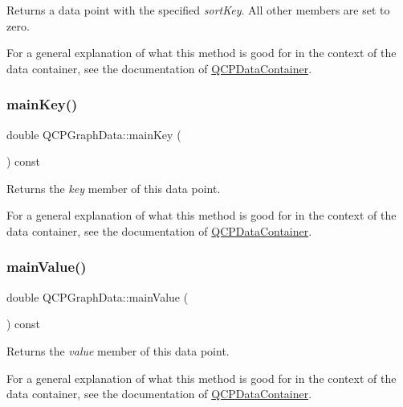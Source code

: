 Returns a data point with the specified {\itshape sort\+Key}. All other members are set to zero.

For a general explanation of what this method is good for in the context of the data container, see the documentation of \mbox{\hyperlink{class_q_c_p_data_container}{Q\+C\+P\+Data\+Container}}. \mbox{\label{class_q_c_p_graph_data_a72fdaf738f679ef93bea3d552ba42d1b}} 
\subsubsection{\texorpdfstring{mainKey()}{mainKey()}}
{\footnotesize\ttfamily double Q\+C\+P\+Graph\+Data\+::main\+Key (\begin{DoxyParamCaption}{ }\end{DoxyParamCaption}) const\hspace{0.3cm}{\ttfamily [inline]}}

Returns the {\itshape key} member of this data point.

For a general explanation of what this method is good for in the context of the data container, see the documentation of \mbox{\hyperlink{class_q_c_p_data_container}{Q\+C\+P\+Data\+Container}}. \mbox{\label{class_q_c_p_graph_data_a1b1e440a430a4a83d9a3f6f247510f27}} 
\subsubsection{\texorpdfstring{mainValue()}{mainValue()}}
{\footnotesize\ttfamily double Q\+C\+P\+Graph\+Data\+::main\+Value (\begin{DoxyParamCaption}{ }\end{DoxyParamCaption}) const\hspace{0.3cm}{\ttfamily [inline]}}

Returns the {\itshape value} member of this data point.

For a general explanation of what this method is good for in the context of the data container, see the documentation of \mbox{\hyperlink{class_q_c_p_data_container}{Q\+C\+P\+Data\+Container}}. \mbox{\label{class_q_c_p_graph_data_a5e0f37ea101eeec245d8c32a2206b204}} 
